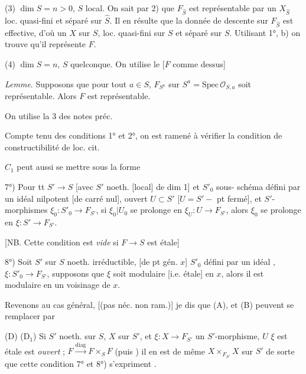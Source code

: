 \documentclass[11pt,a4paper]{article}
\begin{document}
(3) $\dim S = n > 0$, $S$ local. On sait par 2) que $F_{\hat{S}}$ est
représentable par un $X_{\hat{S}}$ loc. quasi-fini et séparé sur
$\hat{S}$.  Il en résulte que la donnée de descente
 sur $F_{\hat{S}}$ est effective, 
d'où un $X$ sur $S$, loc. quasi-fini sur $S$ et séparé sur $S$. Utilisant
1°, b) on trouve qu'il représente $F$.

(4) $\dim S = n$, $S$ quelconque.  On utilise le
[$F$ comme dessus]

\emph{Lemme}. Supposons que pour tout $a \in S$, $F_{S^a}$ sur
$S^a = \mathrm{Spec}\, \mathcal{O}_{S,a}$ soit représentable. Alors $F$
est représentable.

On utilise la  3 des notes préc.


Compte tenu des conditions 1° et 2°, on est ramené à vérifier la condition
de constructibilité de loc. cit.

$C_1$ peut aussi se mettre sous la forme

7°) Pour tt $S' \to S$ [avec $S'$  noeth. [local]
  de dim 1] et $S'_0$
sous- schéma défini par un idéal nilpotent [de carré
nul],  ouvert $U \subset S'$ [$U = S' - $ pt fermé], et
 $S'$-morphismes
$\xi_0 : S'_0 \to F_{S'}$,   si
$\xi_0 | U_0$ se prolonge en $\xi_U : U \to F_{S'}$, alors $\xi_0$ se
prolonge en $\xi : S' \to F_{S'}$.


[NB. Cette condition est \emph{vide} si $F \to S$ est étale]


8°) Soit $S'$ sur $S$ noeth. irréductible, [de pt gén. $x$] $S'_0$ défini
par un idéal , $\xi : S'_0 \to F_{S'}$, supposons que
$\xi$ soit modulaire [i.e. étale] en $x$, alors il est modulaire en un
voisinage de $x$.

Revenons au cas général, [(pas néc. non ram.)] je dis que (A), et (B)
peuvent se remplacer par

(D) (D${}_1$) Si $S'$ noeth. sur $S$,  \struck{\ill{}}
$X$  sur $S'$, et $\xi : X \to F_{S'}$ un $S'$-morphisme,
\ill{} $U$ \ill{} $\xi$ est  étale est \emph{ouvert} ;
 $F \xrightarrow{\mathrm{diag}} F \times_S F$ (puis \ill{})
\ill{} il en est de même \ill{} \ill{} $X \times_{F_{S'}} X$ sur $S'$
\ill{} de sorte que cette condition \ill{} 7° et 8°) s'expriment
\ill{}.
\end{document}
